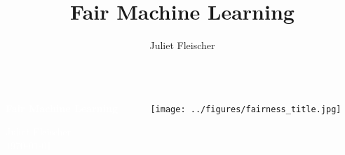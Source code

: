 \documentclass[aspectratio=169]{beamer}
\title{Fair Machine Learning}
\author{Juliet Fleischer} %
\institute[LMU]{LMU} %
{

}
\begin{document}
{
\begin{frame}
\begin{columns}
	\begin{column}{0.4\textwidth}
		\vspace{3cm}
		
		\textbf{\textcolor{white}{\Large Fair Machine Learning}}
		\vspace{1cm}
		
		\textcolor{white}{\footnotesize Juliet Fleischer \\
			\today}
	\end{column}
	\begin{column}{0.49\textwidth}
		\vspace{2cm}
		\begin{center}
			\texttt{[image: ../figures/fairness\_title.jpg]}
		\end{center}
	\end{column}
\end{columns}
\end{frame}
}
\end{document}

